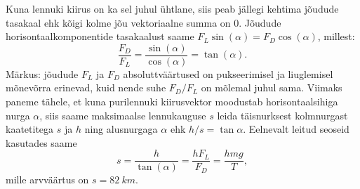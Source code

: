 Kuna lennuki kiirus on ka sel juhul ühtlane, siis peab jällegi kehtima jõudude tasakaal ehk kõigi kolme jõu vektoriaalne summa on 0. Jõudude horisontaalkomponentide tasakaalust saame $F_L\sin(\alpha) = F_D\cos(\alpha)$, millest:
\begin{equation}
	\frac{F_D}{F_L} = \frac{\sin(\alpha)}{\cos(\alpha)}=\tan(\alpha).
\end{equation}
Märkus: jõudude $F_L$ ja $F_D$ absoluttväärtused on pukseerimisel ja liuglemisel mõnevõrra erinevad, kuid nende suhe $F_D/F_L$ on mõlemal juhul sama.
Viimaks paneme tähele, et kuna purilennuki kiirusvektor moodustab horisontaalsihiga nurga $\alpha$, siis saame maksimaalse lennukauguse $s$ leida täisnurksest kolmnurgast kaatetitega $s$ ja $h$ ning alusnurgaga $\alpha$ ehk $h/s = \tan{\alpha}$. Eelnevalt leitud seoseid kasutades saame
\begin{equation}
s = \frac{h}{\tan(\alpha)} = \frac{hF_L}{F_D} = \frac{hmg}{T},
\end{equation}
mille arvväärtus on $s = \SI{82}{km}$.
\probend